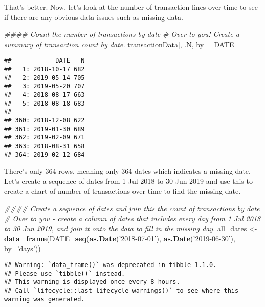 \documentclass[]{article}
\newenvironment{Shaded}{\begin{snugshade}}{\end{snugshade}}
\newcommand{\CommentTok}[1]{\textcolor[rgb]{0.56,0.35,0.01}{\textit{#1}}}
\newcommand{\DataTypeTok}[1]{\textcolor[rgb]{0.13,0.29,0.53}{#1}}
\newcommand{\KeywordTok}[1]{\textcolor[rgb]{0.13,0.29,0.53}{\textbf{#1}}}
\newcommand{\NormalTok}[1]{#1}
\newcommand{\StringTok}[1]{\textcolor[rgb]{0.31,0.60,0.02}{#1}}
\begin{document}
That's better. Now, let's look at the number of transaction lines over
time to see if there are any obvious data issues such as missing data.

\begin{Shaded}
\begin{Highlighting}[]
\CommentTok{#### Count the number of transactions by date}
\CommentTok{# Over to you! Create a summary of transaction count by date.}
\NormalTok{transactionData[, .N, by =}\StringTok{ }\NormalTok{DATE]}
\end{Highlighting}
\end{Shaded}

\begin{verbatim}
##            DATE   N
##   1: 2018-10-17 682
##   2: 2019-05-14 705
##   3: 2019-05-20 707
##   4: 2018-08-17 663
##   5: 2018-08-18 683
##  ---               
## 360: 2018-12-08 622
## 361: 2019-01-30 689
## 362: 2019-02-09 671
## 363: 2018-08-31 658
## 364: 2019-02-12 684
\end{verbatim}

There's only 364 rows, meaning only 364 dates which indicates a missing
date. Let's create a sequence of dates from 1 Jul 2018 to 30 Jun 2019
and use this to create a chart of number of transactions over time to
find the missing date.

\begin{Shaded}
\begin{Highlighting}[]
\CommentTok{#### Create a sequence of dates and join this the count of transactions by date}
\CommentTok{# Over to you - create a column of dates that includes every day from 1 Jul 2018 to 30 Jun 2019, and join it onto the data to fill in the missing day.}
\NormalTok{all_dates <-}\StringTok{ }\KeywordTok{data_frame}\NormalTok{(}\DataTypeTok{DATE=}\KeywordTok{seq}\NormalTok{(}\KeywordTok{as.Date}\NormalTok{(}\StringTok{'2018-07-01'}\NormalTok{), }\KeywordTok{as.Date}\NormalTok{(}\StringTok{'2019-06-30'}\NormalTok{), }\DataTypeTok{by=}\StringTok{'days'}\NormalTok{))}
\end{Highlighting}
\end{Shaded}

\begin{verbatim}
## Warning: `data_frame()` was deprecated in tibble 1.1.0.
## Please use `tibble()` instead.
## This warning is displayed once every 8 hours.
## Call `lifecycle::last_lifecycle_warnings()` to see where this warning was generated.
\end{verbatim}
\end{document}
